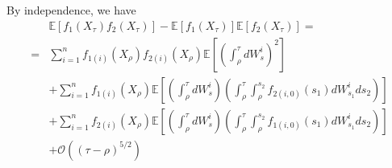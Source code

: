 \documentclass[12pt]{article}
\begin{document}
By independence, we have
\begin{equation}
\begin{aligned}
& \mathbb{E} [f_1(X_\tau) f_2(X_\tau) ] - \mathbb{E}[f_1(X_\tau)]\mathbb{E}[f_2(X_\tau)]= \\
=  &  \sum_{i=1}^n  f_{1(i)}(X_\rho) f_{2(i)}(X_\rho) \mathbb{E} \left[ \left(\int_\rho^\tau dW_s^i \right)^2  \right] \\
 & + \sum_{i=1}^n f_{1(i)}(X_\rho) \mathbb{E} \left[ \left(\int_\rho^\tau dW_s^i \right)  \left(\int_\rho^\tau \int_{\rho}^{s_2} f_{2(i,0)}(s_1) dW_{s_1}^i ds_2 \right) \right] \\ 
 & + \sum_{i=1}^n  f_{2(i)}(X_\rho) \mathbb{E} \left[ \left(\int_\rho^\tau dW_s^i \right)  \left(\int_\rho^\tau \int_{\rho}^{s_2} f_{1(i,0)}(s_1) dW_{s_1}^i ds_2 \right) \right] \\
& + \mathcal{O} ((\tau - \rho)^{5/2})
 \end{aligned}
\end{equation}
\end{document}
